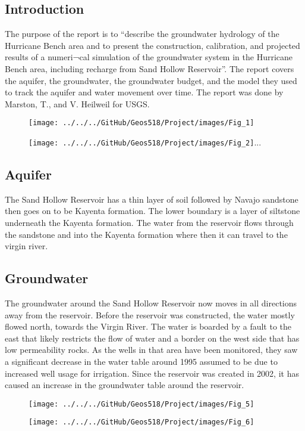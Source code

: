 \documentclass[]{report}
\begin{document}
\subsection{Introduction}
The purpose of the report is to “describe the groundwater hydrology of the Hurricane Bench area and to present the construction, calibration, and projected results of a numeri¬cal simulation of the groundwater system in the Hurricane Bench area, including recharge from Sand Hollow Reservoir”. The report covers the aquifer, the groundwater, the groundwater budget, and the model they used to track the aquifer and water movement over time. The report was done by Marston, T., and V. Heilweil for USGS.\\
\begin{figure}[h]
	\centering
	\begin{minipage}{0.4\textwidth}
		\texttt{[image: ../../../GitHub/Geos518/Project/images/Fig\_1]}
	\end{minipage}
	\hfill
	\begin{minipage}{0.4\textwidth}
		\texttt{[image: ../../../GitHub/Geos518/Project/images/Fig\_2]}...
	\end{minipage}
\end{figure}

\subsection{Aquifer}
The Sand Hollow Reservoir has a thin layer of soil followed by Navajo sandstone then goes on to be Kayenta formation. The lower boundary is a layer of siltstone underneath the Kayenta formation. The water from the reservoir flows through the sandstone and into the Kayenta formation where then it can travel to the virgin river.\\
\subsection{Groundwater}
The groundwater around the Sand Hollow Reservoir now moves in all directions away from the reservoir. Before the reservoir was constructed, the water mostly flowed north, towards the Virgin River. The water is boarded by a fault to the east that likely restricts the flow of water and a border on the west side that has low permeability rocks. As the wells in that area have been monitored, they saw a significant decrease in the water table around 1995 assumed to be due to increased well usage for irrigation. Since the reservoir was created in 2002, it has caused an increase in the groundwater table around the reservoir.\\
\begin{figure}[h]
	\centering
	\begin{minipage}{0.4\textwidth}
		\texttt{[image: ../../../GitHub/Geos518/Project/images/Fig\_5]}
	\end{minipage}
	\hfill
	\begin{minipage}{0.4\textwidth}
		\texttt{[image: ../../../GitHub/Geos518/Project/images/Fig\_6]}
	\end{minipage}
\end{figure}
\end{document}
